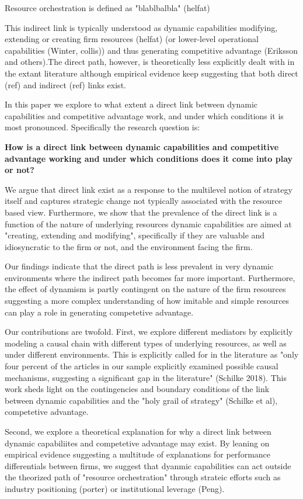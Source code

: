 \documentclass[review,fleqn]{elsarticle}\usepackage[]{graphicx}\usepackage[]{color}
\begin{document}
 Resource orchestration is defined as "blablbalbla" (helfat)

This indirect link is typically understood as dynamic capabilities modifying, extending or
creating firm resources (helfat) (or lower-level operational capabilities (Winter,
collis)) and thus generating competitive advantage (Eriksson and others).The direct path,
however, is theoretically less explicitly dealt with in the extant literature although
empirical evidence keep suggesting that both direct (ref) and indirect (ref) links exist.

In this paper we explore to what extent a direct link between dynamic capabilities and
competitive advantage work, and under which conditions it is most pronounced. Specifically
the research question is:

{\bf How is a direct link between dynamic capabilities and competitive advantage working
  and under which conditions does it come into play or not?}

We argue that direct link exist as a response to the multilevel notion of strategy itself
and captures strategic change not typically associated with the resource based
view. Furthermore, we show that the prevalence of the direct link is a function of the
nature of underlying resources dynamic capabilities are aimed at "creating, extending and
modifying", specifically if they are valuable and idiosyncratic to the firm or not, and
the environment facing the firm. 

Our findings indicate that the direct path is less prevalent in very dynamic environments
where the indirect path becomes far more important. Furthermore, the effect of dynamism is
partly contingent on the nature of the firm resources suggesting a more complex
understanding of how imitable and simple resources can play a role in generating
competetive advantage. 

Our contributions are twofold. First, we explore different mediators by explicitly
modeling a causal chain with different types of underlying resources, as well as
under different environments. This is explicitly called for in the literature as "only
four percent of the articles in our sample explicitly examined possible causal mechanisms,
suggesting a significant gap in the literature" (Schilke 2018). This work sheds light on
the contingencies and boundary conditions of the link between dynamic capabilities and the
"holy grail of strategy" (Schilke et al), competetive advantage. 

Second, we explore a theoretical explanation for why a direct link between dynamic
capabiliites and competetive advantage may exist. By leaning on empirical evidence
suggesting a multitude of explanations for performance differentials between firms, we
suggest that dyanmic capabilities can act outside the theorized path of "resource
orchestration" through strateic efforts such as industry positioning (porter) or
institutional leverage (Peng). 
\end{document}
